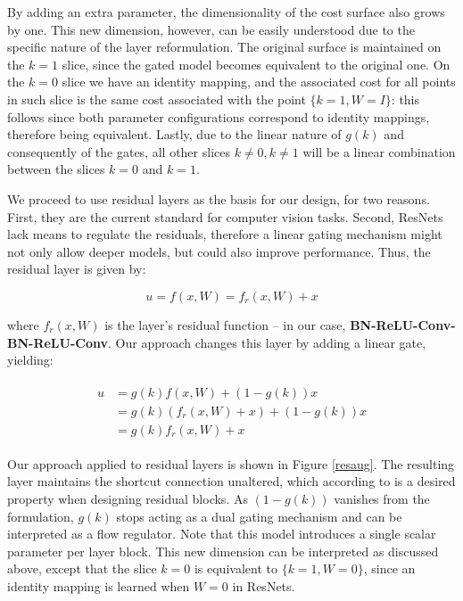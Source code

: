 \documentclass{article} %
\begin{document}
By adding an extra parameter, the dimensionality of the cost surface also grows by one. This new dimension, however, can be easily understood due to the specific nature of the layer reformulation. The original surface is maintained on the $k = 1$ slice, since the gated model becomes equivalent to the original one. On the $k = 0$ slice we have an identity mapping, and the associated cost for all points in such slice is the same cost associated with the point $\{k = 1, W = I\}$: this follows since both parameter configurations correspond to identity mappings, therefore being equivalent. Lastly, due to the linear nature of  $g(k)$ and consequently of the gates, all other slices $k \neq 0, k \neq 1$ will be a linear combination between the slices $k = 0$ and $k = 1$.

We proceed to use residual layers as the basis for our design, for two reasons. First, they are the current standard for computer vision tasks. Second, ResNets lack means to regulate the residuals, therefore a linear gating mechanism might not only allow deeper models, but could also improve performance. Thus, the residual layer is given by:

\begin{equation*}
	u = f(x,W) = f_r(x, W) + x
\end{equation*}

where $f_r(x,W)$ is the layer's residual function -- in our case, \textbf{BN-ReLU-Conv-BN-ReLU-Conv}. Our approach changes this layer by adding a linear gate, yielding:

\begin{align*}
\begin{split}
	 u &= g(k) f(x,W) + (1 - g(k))x \\
	&=  g(k) ( f_r(x, W) + x ) + (1 - g(k))x \\
	&= g(k) f_r(x,W) + x
\end{split}
\end{align*}

Our approach applied to residual layers is shown in Figure \ref{resaug}. The resulting layer maintains the shortcut connection unaltered, which according to \cite{resnet2} is a desired property when designing residual blocks. As $(1 - g(k))$ vanishes from the formulation, $g(k)$ stops acting as a dual gating mechanism and can be interpreted as a flow regulator. Note that this model introduces a single scalar parameter per layer block. This new dimension can be interpreted as discussed above, except that the slice $k = 0$ is equivalent to $\{k = 1, W = 0\}$, since an identity mapping is learned when $W = 0$ in ResNets.
\end{document}
